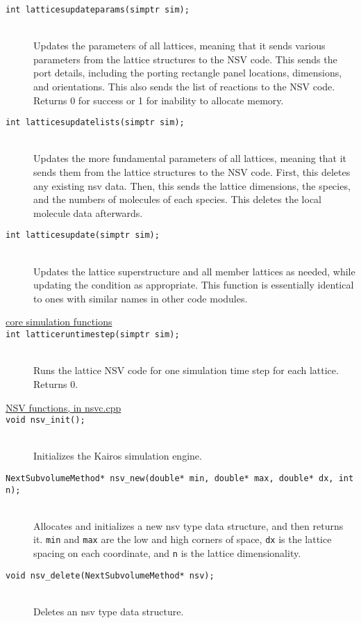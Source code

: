 \documentclass {scrbook}
\newcommand {\ttt} {\texttt}
\begin{document}
\begin{description}
\item[\ttt{int latticesupdateparams(simptr sim);}]
\hfill \\
Updates the parameters of all lattices, meaning that it sends various parameters from the lattice structures to the NSV code. This sends the port details, including the porting rectangle panel locations, dimensions, and orientations. This also sends the list of reactions to the NSV code. Returns 0 for success or 1 for inability to allocate memory.

\item[\ttt{int latticesupdatelists(simptr sim);}]
\hfill \\
Updates the more fundamental parameters of all lattices, meaning that it sends them from the lattice structures to the NSV code. First, this deletes any existing nsv data. Then, this sends the lattice dimensions, the species, and the numbers of molecules of each species. This deletes the local molecule data afterwards.

\item[\ttt{int latticesupdate(simptr sim);}]
\hfill \\
Updates the lattice superstructure and all member lattices as needed, while updating the condition as appropriate. This function is essentially identical to ones with similar names in other code modules.

\item[\underline{core simulation functions}]

\item[\ttt{int latticeruntimestep(simptr sim);}]
\hfill \\
Runs the lattice NSV code for one simulation time step for each lattice. Returns 0.

\item[\underline{NSV functions, in nsvc.cpp}]

\item[\ttt{void nsv\_init();}]
\hfill \\
Initializes the Kairos simulation engine.

\item[\ttt{NextSubvolumeMethod* nsv\_new(double* min, double* max, double* dx, int n);}]
\hfill \\
Allocates and initializes a new nsv type data structure, and then returns it. \ttt{min} and \ttt{max} are the low and high corners of space, \ttt{dx} is the lattice spacing on each coordinate, and \ttt{n} is the lattice dimensionality.

\item[\ttt{void nsv\_delete(NextSubvolumeMethod* nsv);}]
\hfill \\
Deletes an nsv type data structure.


\end{description}
\end{document}
